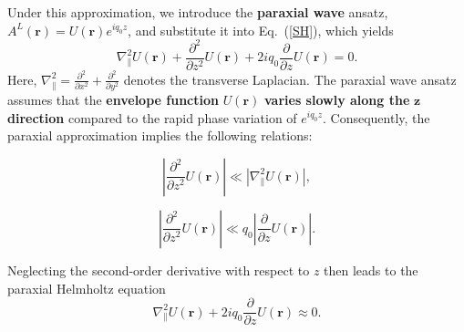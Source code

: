 Under this approximation, we introduce the \textbf{paraxial wave} ansatz, $A^L(\boldsymbol{r}) = U(\boldsymbol{r}) e^{iq_0 z}$, and substitute it into Eq.~(\ref{SH}), which yields 
\begin{equation}
\nabla^2_\parallel U(\boldsymbol{r})
+ \frac{\partial^2}{\partial z^2} U(\boldsymbol{r})
+ 2 i q_0 \frac{\partial}{\partial z} U(\boldsymbol{r}) = 0.
\label{parahelm}
\end{equation}
Here, $\nabla^2_\parallel = \frac{\partial^2}{\partial x^2} + \frac{\partial^2}{\partial y^2}$ denotes the transverse Laplacian. The paraxial wave ansatz assumes that the \textbf{envelope function} $U(\boldsymbol{r})$ \textbf{varies slowly along the} $\boldsymbol{z}$ \textbf{direction} compared to the rapid phase variation of $e^{i q_0 z}$. Consequently, the paraxial approximation implies the following relations:

\begin{minipage}{0.48\textwidth}
    \begin{equation}
    \left| \frac{\partial^2}{\partial z^2} U(\boldsymbol{r}) \right|
    \ll
    \left| \nabla^2_\parallel U(\boldsymbol{r}) \right|,
    \label{paraxial1}
    \end{equation}
\end{minipage}
\hfill %
\begin{minipage}{0.48\textwidth}
    \begin{equation}
    \left| \frac{\partial^2}{\partial z^2} U(\boldsymbol{r}) \right|
    \ll
    q_0 \left| \frac{\partial}{\partial z} U(\boldsymbol{r}) \right|.
    \label{paraxial2}
    \end{equation}
\end{minipage}
\vspace{1.75\baselineskip} %
Neglecting the second-order derivative with respect to $z$ then leads to the paraxial Helmholtz equation
\begin{equation}
\nabla^2_\parallel U(\boldsymbol{r}) + 2 i q_0 \frac{\partial}{\partial z} U(\boldsymbol{r}) \approx 0.
\label{PHE}
\end{equation}

